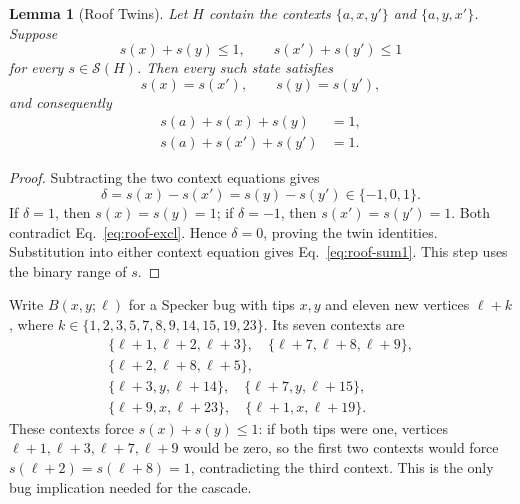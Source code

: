 \documentclass[aps,pra,reprint,superscriptaddress,longbibliography,nofootinbib,floatfix,10pt]{revtex4-2}
\newtheorem{lemma}[theorem]{Lemma}
\theoremstyle{definition}\newtheorem{definition}[theorem]{Definition}
\theoremstyle{remark}\newtheorem{remark}[theorem]{Remark}
\newcommand{\Sc}{\mathcal S}\newcommand{\Cc}{\mathcal C}\newcommand{\Wc}{\mathcal W}
\begin{document}
\begin{lemma}[Roof Twins]\label{lem:roof-twin}
Let $H$ contain the contexts $\{a,x,y'\}$ and $\{a,y,x'\}$. Suppose
\begin{equation}\label{eq:roof-excl}
s(x)+s(y)\le1,\qquad s(x')+s(y')\le1
\end{equation}
for every $s\in\Sc(H)$. Then every such state satisfies
\begin{equation}\label{eq:roof-twins}
s(x)=s(x'),\qquad s(y)=s(y'),
\end{equation}
and consequently
\begin{equation}\label{eq:roof-sum1}
\begin{aligned}
s(a)+s(x)+s(y)&=1,\\
s(a)+s(x')+s(y')&=1.
\end{aligned}
\end{equation}
\end{lemma}
\begin{proof}
Subtracting the two context equations gives
\[
\delta=s(x)-s(x')=s(y)-s(y')\in\{-1,0,1\}.
\]
If $\delta=1$, then $s(x)=s(y)=1$; if $\delta=-1$, then $s(x')=s(y')=1$. Both contradict Eq.~\eqref{eq:roof-excl}. Hence $\delta=0$, proving the twin identities. Substitution into either context equation gives Eq.~\eqref{eq:roof-sum1}. This step uses the binary range of $s$.
\end{proof}

Write $B(x,y;\ell)$ for a Specker bug with tips $x,y$ and eleven new vertices $\ell+k$, where $k\in\{1,2,3,5,7,8,9,14,15,19,23\}$. Its seven contexts are
\begin{equation}\label{eq:roof-bug-contexts}
\begin{gathered}
\{\ell+1,\ell+2,\ell+3\},\quad
\{\ell+7,\ell+8,\ell+9\},\\
\{\ell+2,\ell+8,\ell+5\},\\
\{\ell+3,y,\ell+14\},\quad
\{\ell+7,y,\ell+15\},\\
\{\ell+9,x,\ell+23\},\quad
\{\ell+1,x,\ell+19\}.
\end{gathered}
\end{equation}
These contexts force $s(x)+s(y)\le1$: if both tips were one, vertices $\ell+1,\ell+3,\ell+7,\ell+9$ would be zero, so the first two contexts would force $s(\ell+2)=s(\ell+8)=1$, contradicting the third context. This is the only bug implication needed for the cascade.
\end{document}
